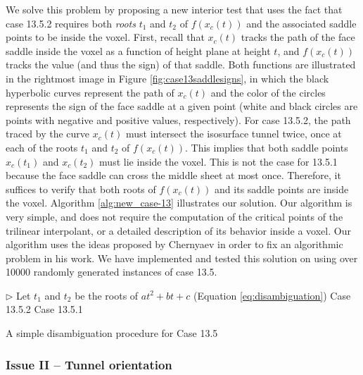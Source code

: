 We solve this problem by proposing a new interior test that uses the fact that case 13.5.2 requires both \emph{roots} $t_1$ and $t_2$ of $f(x_c(t))$ and the associated saddle points to be inside the voxel. 
%
First, recall that $x_c(t)$ tracks the path of the face saddle inside the voxel as a function of height plane at height $t$, and $f(x_c(t))$ tracks the value (and thus the sign) of that saddle. Both functions are illustrated in the rightmost image in Figure \ref{fig:case13saddlesigns}, in which the black hyperbolic curves represent the path of $x_c(t)$ and the color of the circles represents the sign of the face saddle at a given point (white and black circles are points with negative and positive values, respectively).
%
For case 13.5.2, the path traced by the curve $x_c(t)$ must intersect the isosurface tunnel twice, once at each of the roots $t_1$ and $t_2$ of $f(x_c(t))$. 
%
This implies that both saddle points $x_c(t_1)$ and $x_c(t_2)$ must lie inside the voxel. This is not the case for 13.5.1 because the face saddle can cross the middle sheet at most once. Therefore, it suffices to verify that both roots of $f(x_c(t))$ and its saddle points are inside the voxel. Algorithm \ref{alg:new_case-13} illustrates our solution. Our algorithm is very simple, and does not require the computation of the critical points of the trilinear interpolant, or a detailed description of its behavior inside a voxel. Our algorithm uses the ideas proposed by Chernyaev in order to fix an algorithmic problem in his work.
%
We have implemented and tested this solution on \cmc{} using over 10000 randomly generated instances of case 13.5.

\begin{algorithm}
\begin{codebox}
\zi $\rhd$ Let $t_1$ and $t_2$ be the roots of $a t^2 + b t + c$ (Equation \eqref{eq:disambiguation})
\li {} 
\li	\Then \Return Case 13.5.2
\li	 \Else \Return  Case 13.5.1
\End
\end{codebox}
\caption{\label{alg:new_case-13}A simple disambiguation procedure for Case 13.5}
\end{algorithm}

\subsubsection{Issue II -- Tunnel orientation}
\label{sec:TunnelOrientation}

